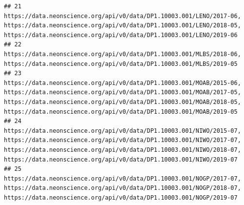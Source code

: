 \documentclass[]{book}
\begin{document}
\begin{verbatim}
## 21                                                                                                                                                                                                                                                                                                                                                                                                                               https://data.neonscience.org/api/v0/data/DP1.10003.001/LENO/2017-06, https://data.neonscience.org/api/v0/data/DP1.10003.001/LENO/2018-05, https://data.neonscience.org/api/v0/data/DP1.10003.001/LENO/2019-06
## 22                                                                                                                                                                                                                                                                                                                                                                                                                                                                                                    https://data.neonscience.org/api/v0/data/DP1.10003.001/MLBS/2018-06, https://data.neonscience.org/api/v0/data/DP1.10003.001/MLBS/2019-05
## 23                                                                                                                                                                                                                                                                                                                                                          https://data.neonscience.org/api/v0/data/DP1.10003.001/MOAB/2015-06, https://data.neonscience.org/api/v0/data/DP1.10003.001/MOAB/2017-05, https://data.neonscience.org/api/v0/data/DP1.10003.001/MOAB/2018-05, https://data.neonscience.org/api/v0/data/DP1.10003.001/MOAB/2019-05
## 24                                                                                                                                                                                                                                                                                                                                                          https://data.neonscience.org/api/v0/data/DP1.10003.001/NIWO/2015-07, https://data.neonscience.org/api/v0/data/DP1.10003.001/NIWO/2017-07, https://data.neonscience.org/api/v0/data/DP1.10003.001/NIWO/2018-07, https://data.neonscience.org/api/v0/data/DP1.10003.001/NIWO/2019-07
## 25                                                                                                                                                                                                                                                                                                                                                                                                                               https://data.neonscience.org/api/v0/data/DP1.10003.001/NOGP/2017-07, https://data.neonscience.org/api/v0/data/DP1.10003.001/NOGP/2018-07, https://data.neonscience.org/api/v0/data/DP1.10003.001/NOGP/2019-07

\end{verbatim}
\end{document}
